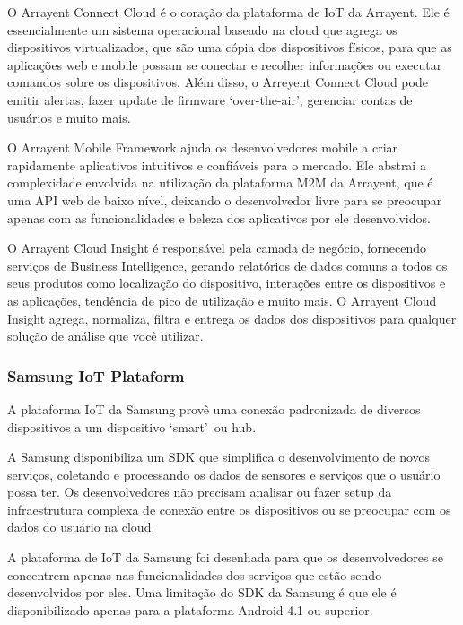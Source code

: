 O Arrayent Connect Cloud é o coração da plataforma de IoT da Arrayent. Ele é essencialmente um sistema
operacional baseado na cloud que agrega os dispositivos virtualizados, que são uma cópia dos dispositivos
físicos, para que as aplicações web e mobile possam se conectar e recolher informações ou executar comandos
sobre os dispositivos. Além disso, o Arreyent Connect Cloud pode emitir alertas, fazer update de firmware
\lq over-the-air\rq, gerenciar contas de usuários e muito mais.

O Arrayent Mobile Framework ajuda os desenvolvedores mobile a criar rapidamente aplicativos intuitivos e
confiáveis para o mercado. Ele abstrai a complexidade envolvida na utilização da plataforma M2M da Arrayent,
que é uma API web de baixo nível, deixando o desenvolvedor livre para se preocupar apenas com as funcionalidades
e beleza dos aplicativos por ele desenvolvidos.

O Arrayent Cloud Insight é responsável pela camada de negócio, fornecendo serviços de Business Intelligence,
gerando relatórios de dados comuns a todos os seus produtos como localização do dispositivo, interações entre
os dispositivos e as aplicações, tendência de pico de utilização e muito mais. O Arrayent Cloud Insight agrega,
normaliza, filtra e entrega os dados dos dispositivos para qualquer solução de análise que você utilizar.

\subsubsection{Samsung IoT Plataform}
A plataforma IoT da Samsung provê uma conexão padronizada de diversos dispositivos a um dispositivo
\lq smart\rq\ ou hub.

A Samsung disponibiliza um SDK que simplifica o desenvolvimento de novos serviços, coletando
e processando os dados de sensores e serviços que o usuário possa ter. Os desenvolvedores não precisam analisar ou
fazer setup da infraestrutura complexa de conexão entre os dispositivos ou se preocupar com os dados do usuário na cloud.

A plataforma de IoT da Samsung foi desenhada para que os desenvolvedores se concentrem apenas nas funcionalidades
dos serviços que estão sendo desenvolvidos por eles. Uma limitação do SDK da Samsung é que ele é disponibilizado
apenas para a plataforma Android 4.1 ou superior.

